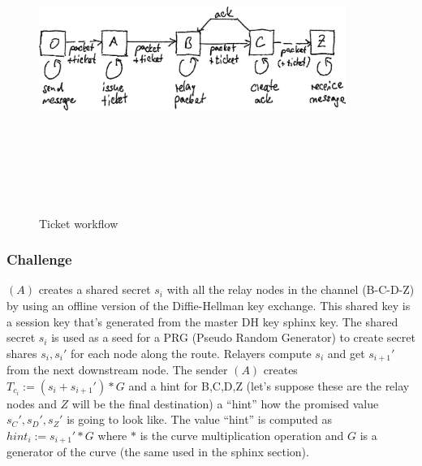  \begin{figure}[H]
    \centering
    \includegraphics[width=10cm,height=10cm,keepaspectratio]{../yellowpaper/images/ticket_workflow.png}
    \caption{Ticket workflow}
    \label{fig:Ticket worklow}
\end{figure}

\subsubsection{Challenge}
$(A)$ creates a shared secret $s_i$ with all the relay nodes in the channel (B-C-D-Z) by using an offline version of the Diffie-Hellman key exchange. This shared key is a session key that's generated from the master DH key sphinx key. 
\newline The shared secret $s_i$ is used as a seed for a PRG (Pseudo Random Generator) to create secret shares $s_i,s_i'$ for each node along the route. 
Relayers compute $s_i$ and get $s_{i+1}'$ from the next downstream node. 
\newline The sender $(A)$ creates $T_{c_i}:=(s_i+s_{i+1}')*G$ and a hint for B,C,D,Z (let’s suppose these are the relay nodes and $Z$ will be the final destination) a “hint” how the promised value $s_C',s_D',s_Z'$ is going to look like. 
The value “hint” is computed as $hint_i:=s_{i+1}'*G$ where $*$ is the curve multiplication operation and $G$ is a generator of the curve (the same used in the sphinx section).


